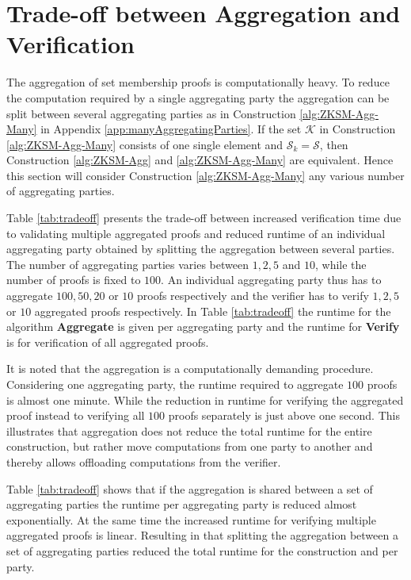 \section{Trade-off between Aggregation and Verification}
\label{sec:tradeoff}
The aggregation of set membership proofs is computationally heavy. To reduce the computation required by a single aggregating party the aggregation can be split between several aggregating parties as in Construction \ref{alg:ZKSM-Agg-Many} in Appendix \ref{app:manyAggregatingParties}. If the set $\mathcal{K}$ in Construction \ref{alg:ZKSM-Agg-Many} consists of one single element and $\mathcal{S}_k=\mathcal{S}$, then Construction \ref{alg:ZKSM-Agg} and \ref{alg:ZKSM-Agg-Many} are equivalent. Hence this section will consider Construction \ref{alg:ZKSM-Agg-Many} any various number of aggregating parties.

Table \ref{tab:tradeoff} presents the trade-off between increased verification time due to  validating multiple aggregated proofs and reduced runtime of  an individual aggregating party obtained by splitting the aggregation between  several parties. The number of aggregating parties varies between $1,2,5$ and $10$, while the number of proofs is fixed to $100$. An individual aggregating party thus has to aggregate $100,50,20$ or $10$  proofs respectively and the verifier has to verify $1,2,5$ or $10$ aggregated proofs respectively. In Table \ref{tab:tradeoff} the runtime for the algorithm \textbf{Aggregate} is given per aggregating party and the runtime for \textbf{Verify} is for verification of all aggregated proofs. 

It is noted that the aggregation is a computationally demanding procedure. Considering one aggregating party, the runtime required to aggregate $100$ proofs is almost one minute. While the reduction in runtime for verifying the aggregated proof instead to verifying all $100$ proofs separately is just above one second. This illustrates that aggregation does not reduce the total runtime for the entire construction, but rather move computations from one party to another and thereby allows offloading computations from the verifier.

Table \ref{tab:tradeoff} shows that if the aggregation is shared between a set of aggregating parties the runtime per aggregating party is reduced almost exponentially. At the same time the increased runtime for verifying multiple aggregated proofs is linear. Resulting in that splitting the aggregation between a set of aggregating parties reduced the total runtime for the construction and per party.



